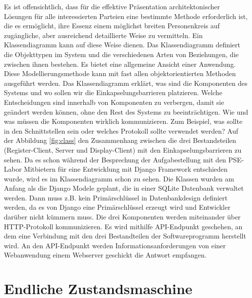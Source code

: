 Es ist offensichtlich, dass für die effektive Präsentation architektonischer Lösungen für alle interessierten Parteien eine bestimmte Methode erforderlich ist, die es ermöglicht, ihre Essenz einem möglichst breiten Personenkreis auf zugängliche, aber ausreichend detaillierte Weise zu vermitteln. Ein Klassendiagramm kann auf diese Weise dienen. Das Klassendiagramm definiert die Objekttypen im System und die verschiedenen Arten von Beziehungen, die zwischen ihnen bestehen. Es bietet eine allgemeine Ansicht einer Anwendung. Diese Modellierungsmethode kann mit fast allen objektorientierten Methoden ausgeführt werden. Das Klassendiagramm erklärt, was sind die Komponenten des Systems und wo sollen wir die Einkapselungsbarrieren platzieren. Welche Entscheidungen sind innerhalb von Komponenten zu verbergen, damit sie geändert werden können, ohne den Rest des Systems zu beeinträchtigen. Wie und was müssen die Komponenten wirklich kommunizieren. Zum Beispiel, was sollte in den Schnittstellen sein oder welches Protokoll sollte verwendet werden? Auf der Abbildung \ref{fig:class} den Zusammenhang zwischen die drei Bestandsteilen (Register-Client, Server und Display-Client) mit den Einkapselungsbarrieren zu sehen. Da es schon während der Besprechung der Aufgabestellung mit den PSE-Labor Mitbietern für eine Entwicklung mit Django Framework entschieden wurde, wird es im Klassendiagramm schon zu sehen. Die Klassen wurden am Anfang als die Django Modele geplant, die in einer SQLite Datenbank verwaltet werden. Dann muss z.B. kein Primärschlüssel in Datenbankdesign definiert werden, da es von Django eine Primärschlüssel erzeugt wird und Entwickler darüber nicht kümmern muss. Die drei Komponenten werden miteinander über HTTP-Protokoll kommunizieren. Es wird mithilfe API-Endpunkt geschehen, an dem eine Verbindung mit den drei Bestandteilen der Softwareprogramm herstellt wird. An den API-Endpunkt werden Informationsanforderungen von einer Webanwendung einem Webserver geschickt die Antwort empfangen.

\section{Endliche Zustandsmaschine}
\label{sec:design:fsm}
